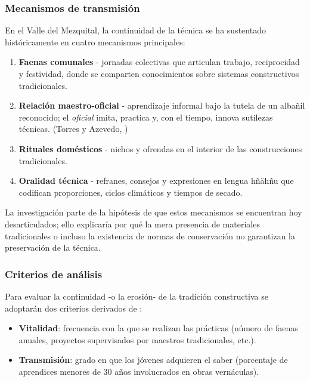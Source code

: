 \subsubsection{Mecanismos de transmisión}

En el Valle del Mezquital, la continuidad de la técnica se ha sustentado
históricamente en cuatro mecanismos principales:

\begin{enumerate}
  \item \textbf{Faenas comunales} - jornadas colectivas que
		articulan trabajo, reciprocidad y festividad, donde se
		comparten conocimientos sobre sistemas constructivos tradicionales.
  \item \textbf{Relación maestro-oficial} - aprendizaje informal bajo la
		tutela de un albañil reconocido; el
		\emph{oficial} imita, practica y, con el tiempo, innova sutilezas
		técnicas. (Torres y Azevedo, \citeyear{torres2021transmision})
  \item \textbf{Rituales domésticos} - nichos y ofrendas en el interior
		de las construcciones tradicionales.
  \item \textbf{Oralidad técnica} - refranes, consejos y
		expresiones en lengua hñähñu que codifican proporciones, ciclos
		climáticos y tiempos de secado.
\end{enumerate}

La investigación parte de la hipótesis de que estos mecanismos se
encuentran hoy desarticulados; ello explicaría por qué la mera
presencia de materiales tradicionales o incluso la existencia de normas
de conservación no garantizan la preservación de la técnica.

\subsubsection{Criterios de análisis}

Para evaluar la continuidad -o la erosión- de la tradición constructiva
se adoptarán dos criterios derivados de \cite{UNESCO2005diversidad}:

\begin{itemize}
  \item \textbf{Vitalidad}: frecuencia con la que se realizan las
		prácticas (número de faenas anuales, proyectos supervisados por
		maestros tradicionales, etc.).
  \item \textbf{Transmisión}: grado en que los jóvenes adquieren el
		saber (porcentaje de aprendices menores de 30 años involucrados
		en obras vernáculas).
\end{itemize}

